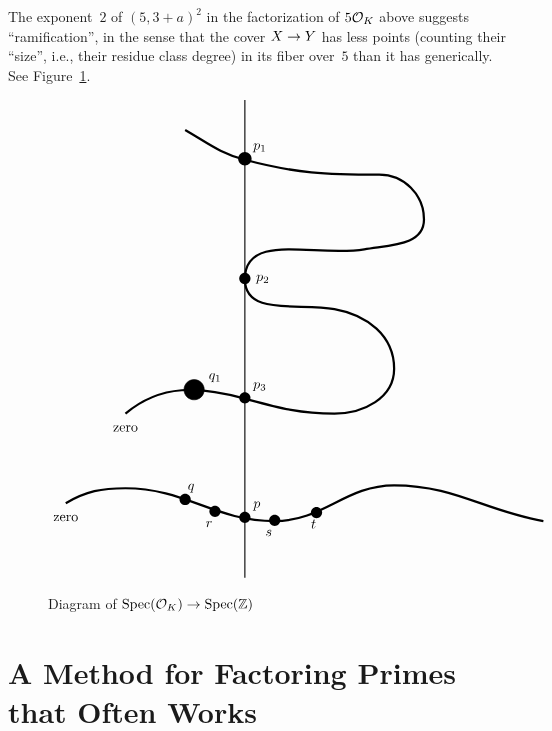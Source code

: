 The exponent~$2$ of $(5,3+a)^2$ in the factorization of $5\mathcal{O}_K$ above
suggests ``ramification'', in the sense that the cover $X \rightarrow Y$ has
less points (counting their ``size'', i.e., their residue class degree)
in its fiber over~$5$ than it has generically.
See Figure~\ref{fig:O_KoverSpecZ}.

\begin{figure}
\centering
$$
\begin{tikzpicture}[scale = 1.5]

\draw[thick] (0, 0) to (0, 8);

\node at (-3, 1) {zero};

\node at (0, 1) {\huge $\bullet$};
\node at (.2, 1.2) {$p$};

\node at (-1, 1.3) {\huge $\bullet$};
\node at (-.9, 1.5) {$q$};

\node at (-2, 2.5) {zero};

\draw [fill] (-.85, 3.15) circle [radius = .17];
\node at (-.5, 3.35) {$q_1$};

\node at (-.5, 1.1) {\huge $\bullet$};
\node at (-.6, .9) {$r$};

\node at (.5, .95) {\huge $\bullet$};
\node at (.4, .75) {$s$};

\node at (1.2, 1.08) {\huge $\bullet$};
\node at (1.15, .9) {$t$};

\node at (0, 3) {\huge $\bullet$};
\node at (.25, 3.2) {$p_3$};

\node at (0, 5) {\huge $\bullet$};
\node at (.3, 5) {$p_2$};

\node at (0, 7) {\Huge $\bullet$};
\node at (.25, 7.2) {$p_1$};

\draw[ultra thick] (-3, 1.25) to [out = 30, in = 180] (-2, 1.5) to [out = 0, in = 180] (.5, .95) to [out = 0, in = 180] (2.5, 1.55) to [out = 0, in = 170] (5, .95);

\draw[ultra thick] (-2, 2.75) to [out = 40, in = 165] (0, 3) to [out = -15, in = 180] (1.5, 2.75) to [out = 0, in = -90] (2.5, 3.5) to [out = 90, in = -10] (1.5, 4.5) to [out = 170, in = -90] (0, 5) to [out = 90, in = 190] (2, 5.5) to [out = 10, in = -90] (3, 6) to [out = 90, in = 0] (2.25, 6.75) to [out = 180, in = -15] (0, 7) to [out = 165, in = -30] (-1, 7.5);

\end{tikzpicture}
$$
\caption{Diagram of $\Spec(\O_K) \ra \Spec(\Z)$}
\label{fig:O_KoverSpecZ}
\end{figure}


\section{A Method for Factoring Primes that Often Works}

